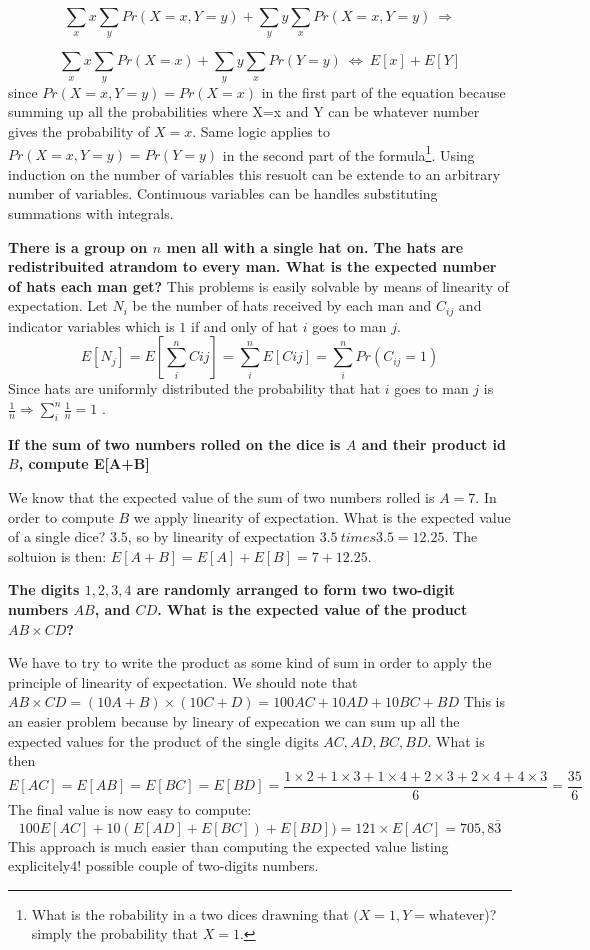 \begin{framed}
\[\sum_x x \sum_y  Pr(X=x,Y=y) + \sum_y y \sum_x   Pr(X=x,Y=y) \: \Longrightarrow \]

\[\sum_x x \sum_y   Pr(X=x) + \sum_y y \sum_x   Pr(Y=y)  \: \Longleftrightarrow \: E[x] + E[Y]\]
since $Pr(X=x,Y=y)= Pr(X=x)$ in the first part of the equation because summing up all the probabilities where X=x and Y can be whatever number gives the probability of $X=x$. Same logic applies to $Pr(X=x,Y=y)= Pr(Y=y)$ in the second part of the formula\footnote{What is the robability in a two dices drawning that $(X=1, Y=$whatever)? simply the probability that $X=1$.}.
Using induction on the number of variables this resuolt can be extende to an arbitrary number of variables. Continuous variables can be handles substituting summations with integrals.

\begin{example}
\textbf{There is a group on $n$ men all with a single hat on. The hats are redistribuited atrandom to every man. What is the expected number of hats each man get?}
This problems is easily solvable by means of linearity of expectation.  Let $N_i$ be the number of hats received by each man and $C_{ij}$ and indicator variables which is $1$ if and only of hat $i$ goes to man $j$.
\[
E[N_j] = E[ \sum_{i}^n C{ij}] = \sum_{i}^n E[C{ij}] = \sum_{i}^n Pr(C_{ij}=1)
\]
Since hats are uniformly distributed the probability that hat $i$ goes to man $j$ is $\frac{1}{n} \Rightarrow  \sum_{i}^n \frac{1}{n} = 1$ .

\end{example}

\begin{example}
\textbf{If the sum of two numbers rolled on the dice is $A$ and their product id $B$, compute E[A+B]}

We know that the expected value of the sum of two numbers rolled is $A=7$. In order to compute $B$ we apply linearity of expectation. What is the expected value of a single dice? $3.5$, so by linearity of expectation $3.5 \ times 3.5 = 12.25$. The soltuion is then: $E[A+B] = E[A]+E[B] = 7 +12.25$.
\end{example}


\begin{example}
\textbf{The digits $1,2,3,4$ are randomly arranged to form two two-digit numbers $AB$, and $CD$. What is the expected value of the product $AB \times CD$?}

We have to try to write the product as some kind of sum in order to apply the principle of linearity of expectation.
We should note that $AB \times CD = (10A+B) \times (10C+D) = 100AC + 10AD +10BC + BD$
This is an easier problem because by lineary of expecation we can sum up all the expected values for the product of the single digits $AC,AD,BC,BD$. What is then
\[
E[AC] =  E[AB] = E[BC]= E[BD] = \frac{1 \times 2 +  1 \times 3 + 1 \times 4 +2 \times 3 +2 \times 4 +4 \times 3 }{6} = \frac{35}{6}
\]
The final value is now easy to compute:
\[
100E[AC] + 10(E[AD] +E[BC]) + E[BD]) = 121 \times E[AC] = 705,8\overline{3} 
\]
This approach is much easier than computing the expected value listing explicitely$4!$ possible couple of two-digits numbers.
\end{example}



\end{framed}

